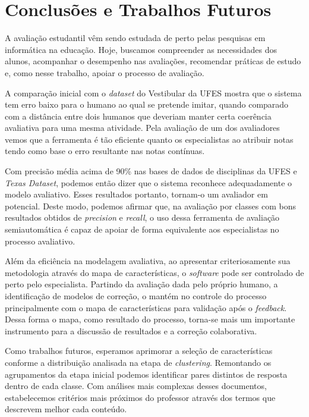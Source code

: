 \chapter{Conclusões e Trabalhos Futuros}\label{conclusao}
A avaliação estudantil vêm sendo estudada de perto pelas pesquisas em informática na educação. Hoje, buscamos compreender as necessidades dos alunos, acompanhar o desempenho nas avaliações, recomendar práticas de estudo e, como nesse trabalho, apoiar o processo de avaliação.

A comparação inicial com o \textit{dataset} do Vestibular da UFES mostra que o sistema tem erro baixo para o humano ao qual se pretende imitar, quando comparado com a distância entre dois humanos que deveriam manter certa coerência avaliativa para uma mesma atividade. Pela avaliação de um dos avaliadores vemos que a ferramenta é tão eficiente quanto os especialistas ao atribuir notas tendo como base o erro resultante nas notas contínuas.

Com precisão média acima de 90\% nas bases de dados de disciplinas da UFES e \textit{Texas Dataset}, podemos então dizer que o sistema reconhece adequadamente o modelo avaliativo. Esses resultados portanto, tornam-o um avaliador em potencial. Deste modo, podemos afirmar que, na avaliação por classes com bons resultados obtidos de \textit{precision} e \textit{recall}, o uso dessa ferramenta de avaliação semiautomática é capaz de apoiar de forma equivalente aos especialistas no processo avaliativo.

Além da eficiência na modelagem avaliativa, ao apresentar criteriosamente sua metodologia através do mapa de características, o \textit{software} pode ser controlado de perto pelo especialista. Partindo da avaliação dada pelo próprio humano, a identificação de modelos de correção, o mantém no controle do processo principalmente com o mapa de características para validação após o \textit{feedback}. Dessa forma o mapa, como resultado do processo, torna-se mais um importante instrumento para a discussão de resultados e a correção colaborativa.

Como trabalhos futuros, esperamos aprimorar a seleção de características conforme a distribuição analisada na etapa de \textit{clustering}. Remontando os agrupamentos da etapa inicial podemos identificar pares distintos de resposta dentro de cada classe. Com análises mais complexas desses documentos, estabelecemos critérios mais próximos do professor através dos termos que descrevem melhor cada conteúdo.

